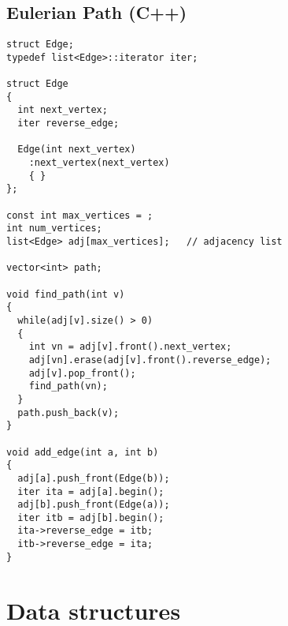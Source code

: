 \subsection{Eulerian Path (C++)}
\begin{lstlisting}
struct Edge;
typedef list<Edge>::iterator iter;

struct Edge
{
  int next_vertex;
  iter reverse_edge;

  Edge(int next_vertex)
    :next_vertex(next_vertex)
    { }
};

const int max_vertices = ;
int num_vertices;
list<Edge> adj[max_vertices];   // adjacency list

vector<int> path;

void find_path(int v)
{
  while(adj[v].size() > 0)
  {
    int vn = adj[v].front().next_vertex;
    adj[vn].erase(adj[v].front().reverse_edge);
    adj[v].pop_front();
    find_path(vn);
  }
  path.push_back(v);
}

void add_edge(int a, int b)
{
  adj[a].push_front(Edge(b));
  iter ita = adj[a].begin();
  adj[b].push_front(Edge(a));
  iter itb = adj[b].begin();
  ita->reverse_edge = itb;
  itb->reverse_edge = ita;
}

\end{lstlisting}
\section{Data structures}
